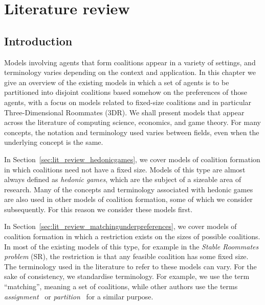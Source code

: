 \chapter{Literature review}
\label{c:lit_review}

\section{Introduction}

Models involving agents that form coalitions appear in a variety of settings, and terminology varies depending on the context and application. In this chapter we give an overview of the existing models in which a set of agents is to be partitioned into disjoint coalitions based somehow on the preferences of those agents, with a focus on models related to fixed-size coalitions and in particular Three-Dimensional Roommates (3DR). We shall present models that appear across the literature of computing science, economics, and game theory. For many concepts, the notation and terminology used varies between fields, even when the underlying concept is the same.

In Section~\ref{sec:lit_review_hedonicgames}, we cover models of coalition formation in which coalitions need not have a fixed size. Models of this type are almost always defined as \emph{hedonic games}, which are the subject of a sizeable area of research. Many of the concepts and terminology associated with hedonic games are also used in other models of coalition formation, some of which we consider subsequently. For this reason we consider these models first.

In Section~\ref{sec:lit_review_matchingunderpreferences}, we cover models of coalition formation in which a restriction exists on the sizes of possible coalitions. In most of the existing models of this type, for example in the \emph{Stable Roommates problem} (SR), the restriction is that any feasible coalition has some fixed size. The terminology used in the literature to refer to these models can vary. For the sake of consistency, we standardise terminology. For example, we use the term ``matching'', meaning a set of coalitions, while other authors use the terms \emph{assignment}~\cite{NH91} or \emph{partition}~\cite{CR01} for a similar purpose.



